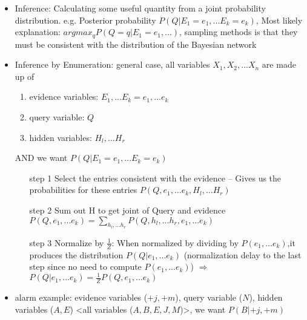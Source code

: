 \documentclass[10pt]{article}
\begin{document}
\begin{itemize}[label=\(\star\), leftmargin=1em, itemsep=-0.3em]
    \item Inference: Calculating some useful quantity from a joint probability distribution. e.g.  Posterior probability $ P(Q|E_1 = e_1,...E_k = e_k)$, Most likely explanation: $argmax_q P(Q = q | E_1 = e_1,...)$, sampling methods is that they must be consistent with the distribution of the Bayesian network
    \item Inference by Enumeration: general case, all variables $X_1, X_2, ... X_n$ are made up of
          \begin{enumerate}[label=\(\star\), leftmargin=1em, itemsep=-0.2em]
              \item evidence variables: $E_1,...E_k = e_1,...e_k$
              \item query variable: $Q$
              \item hidden variables: $H_l,...H_r$
          \end{enumerate}
    \item[] AND we want  $ P(Q|E_1 = e_1,...E_k = e_k)$
          \begin{enumerate}[label=\(\star\), leftmargin=5em, itemsep=-0.2em]
              \item[step 1] Select the entries consistent with the evidence -- Gives us the probabilities for these entries $P(Q,  e_1,...e_k,H_l,...H_r)$
              \item[step 2]  Sum out H to get joint of Query and evidence $P(Q,  e_1,...e_k) = \sum_{h_l, ... h_r} P(Q,h_l, ... h_r, e_1,...e_k)$
              \item[step 3]  Normalize by $\frac{1}{Z}$: When normalized by dividing by $P(e_1,...e_k)$,it produces the distribution $ P(Q | e_1,...e_k)$ (normalization delay to the last step since no need to compute $P(e_1,...e_k)$) $\Longrightarrow$ $P(Q | e_1,...e_k) = \frac{1}{Z} P(Q,  e_1,...e_k)$
          \end{enumerate}

    \item alarm example: evidence variables ($+j, +m$), query variable ($N$), hidden variables ($A, E$) <all variables ($A,B,E,J,M$)>, we want $P(B| +j, +m)$


\end{itemize}
\end{document}
